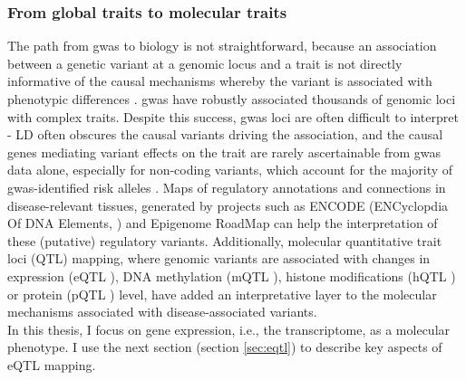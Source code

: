 
\subsubsection{From global traits to molecular traits}

The path from \gls{gwas} to biology is not straightforward, because an association between a genetic variant at a genomic locus and a trait is not directly informative of the causal mechanisms whereby the variant is associated with phenotypic differences \cite{visscher201710}. 
\gls{gwas} have robustly associated thousands of genomic loci with complex traits. 
Despite this success, \gls{gwas} loci are often difficult to interpret - LD often obscures the causal variants driving the association, and the causal genes mediating variant effects on the trait are rarely ascertainable from \gls{gwas} data alone, especially for non-coding variants, which account for the majority of \gls{gwas}-identified risk alleles \cite{manolio2009finding, gallagher2018post, wainberg2019opportunities}. 
Maps of regulatory annotations and connections in disease-relevant tissues, generated by projects such as ENCODE (ENCyclopdia Of DNA Elements, \cite{encode2004encode}) and Epigenome RoadMap \cite{kundaje2015integrative} can help the interpretation of these (putative) regulatory variants.
Additionally, molecular quantitative trait loci (QTL) mapping, where genomic variants are associated with changes in expression (eQTL \cite{schadt2003genetics}), DNA methylation (mQTL \cite{gaunt2016systematic}), histone modifications (hQTL \cite{grubert2015genetic}) or protein (pQTL \cite{melzer2008genome}) level, have added an interpretative layer to the molecular mechanisms associated with disease-associated variants.
\\

In this thesis, I focus on gene expression, i.e., the transcriptome, as a molecular phenotype.
I use the next section (section \ref{sec:eqtl}) to describe key aspects of eQTL mapping.


